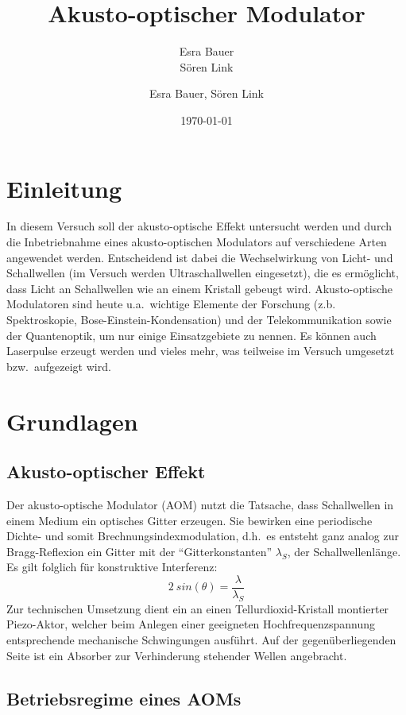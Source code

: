 \documentclass[bigchapter,colorback,accentcolor=tud4b,linedtoc,11pt]{tudreport}
\title{Akusto-optischer Modulator}
\subtitle{Esra Bauer  \\Sören Link}
\author{Esra Bauer, Sören Link}
\date{\today}
\begin{document}

\maketitle

\tableofcontents


\chapter{Einleitung}

In diesem Versuch soll der akusto-optische Effekt untersucht werden und durch die Inbetriebnahme eines akusto-optischen Modulators auf verschiedene Arten angewendet werden. Entscheidend ist dabei die Wechselwirkung von Licht- und Schallwellen (im Versuch werden Ultraschallwellen eingesetzt), die es ermöglicht, dass Licht an Schallwellen wie an einem Kristall gebeugt wird. Akusto-optische Modulatoren sind heute u.a.\ wichtige Elemente der Forschung (z.b. Spektroskopie, Bose-Einstein-Kondensation) und der Telekommunikation sowie der Quantenoptik, um nur einige Einsatzgebiete zu nennen. Es können auch Laserpulse erzeugt werden und vieles mehr, was teilweise im Versuch umgesetzt bzw.\ aufgezeigt wird.

\chapter{Grundlagen}
\section{Akusto-optischer Effekt}

Der akusto-optische Modulator (AOM) nutzt die Tatsache, dass Schallwellen in einem Medium ein optisches Gitter erzeugen. Sie bewirken eine periodische Dichte- und somit Brechnungsindexmodulation, d.h.\ es entsteht ganz analog zur Bragg-Reflexion ein Gitter mit der ``Gitterkonstanten'' $\lambda_S$, der Schallwellenlänge. Es gilt folglich für konstruktive Interferenz: 
$$2~sin(\theta) = \frac{\lambda}{\lambda_S}$$ 
Zur technischen Umsetzung dient ein an einen Tellurdioxid-Kristall montierter Piezo-Aktor, welcher beim Anlegen einer geeigneten Hochfrequenzspannung entsprechende mechanische Schwingungen ausführt. Auf der gegenüberliegenden Seite ist ein Absorber zur Verhinderung stehender Wellen angebracht.

\section{Betriebsregime eines AOMs}
\end{document}
